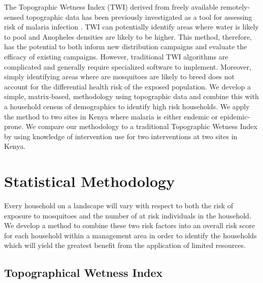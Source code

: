 \documentclass{article}\usepackage[]{graphicx}\usepackage[]{color}
\begin{document}
The Topographic Wetness Index (TWI) \cite{Beven1979} derived from freely available remotely-sensed topographic data has been previously investigated as a tool for assessing risk of malaria infection \cite{Cohen2008,Cohen2010}. TWI can potentially identify areas where water is likely to pool and Anopheles densities are likely to be higher. This method, therefore, has the potential to both inform new distribution campaigns and evaluate the efficacy of existing campaigns.  However, traditional TWI algorithms are complicated and generally require specialized software to implement.  Moreover, simply identifying areas where are mosquitoes are likely to breed does not account for the differential health risk of the exposed population.  We develop a simple, matrix-based, methodology using topographic data and combine this with a household census of demographics to identify high risk households.  We apply the method to two sites in Kenya where malaria is either endemic or epidemic-prone.  We compare our methodology to a traditional Topographic  Wetness Index by using knowledge of intervention use for two interventions at two sites in Kenya. \\%



\section{Statistical Methodology}%
Every household on a landscape will vary with respect to both the risk of exposure to mosquitoes and the number of at risk individuals in the household. We develop a method to combine these two risk factors into an overall risk score for each household within a management area in order to identify the households which will yield the greatest benefit from the application of limited resources.\\

\subsection{Topographical Wetness Index}
\end{document}
